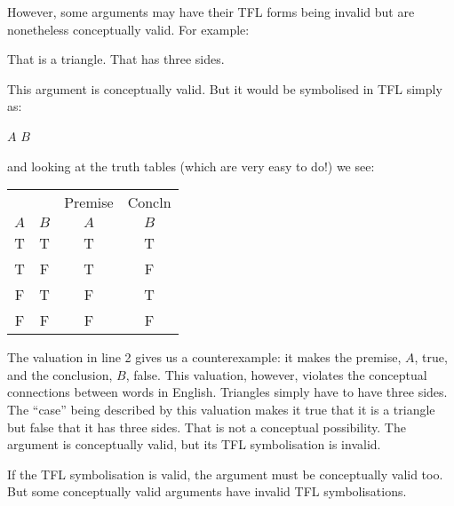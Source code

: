 However, some arguments may have their TFL forms being invalid but are nonetheless conceptually valid. For example:
\begin{earg}
	\prem That is a triangle.
	\conc That has three sides.
\end{earg}
This argument is conceptually valid. But it would be symbolised in TFL simply as:
\begin{earg}
\prem $A$
\conc $B$
\end{earg}and looking at the truth tables (which are very easy to do!) we see:
\begin{center}
\begin{tabular}{cc|cc}
&&Premise&Concln\\
$A$&$B$&$A$&$B$\\\hline
T&T&T&T\\
T&F&T&F\\
F&T&F&T\\
F&F&F&F
\end{tabular}
\end{center}
The valuation in line 2 gives us a counterexample: it makes the premise, $A$, true, and the conclusion, $B$, false.
This valuation, however, violates the conceptual connections between words in English. Triangles simply have to have three sides. The ``case'' being described by this valuation makes it true that it is a triangle but false that it has three sides. That is not a conceptual possibility.
The argument is conceptually valid, but its TFL symbolisation is invalid.

If the TFL symbolisation is valid, the argument must be conceptually valid too. But some conceptually valid arguments have invalid TFL symbolisations.

